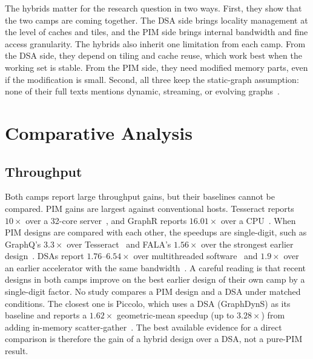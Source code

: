 \documentclass[journal,onecolumn]{IEEEtran}
\begin{document}
The hybrids matter for the research question in two ways. First, they show that the two camps are coming together. The DSA side brings locality management at the level of caches and tiles, and the PIM side brings internal bandwidth and fine access granularity. The hybrids also inherit one limitation from each camp. From the DSA side, they depend on tiling and cache reuse, which work best when the working set is stable. From the PIM side, they need modified memory parts, even if the modification is small. Second, all three keep the static-graph assumption: none of their full texts mentions dynamic, streaming, or evolving graphs~\cite{shin2025piccolo,shin2025fala,yenimol2026cograf}.

\section{Comparative Analysis}\label{sec:analysis}
\subsection{Throughput}
Both camps report large throughput gains, but their baselines cannot be compared. PIM gains are largest against conventional hosts. Tesseract reports $10\times$ over a 32-core server~\cite{ahn2015tesseract}, and GraphR reports $16.01\times$ over a CPU~\cite{song2018graphr}. When PIM designs are compared with each other, the speedups are single-digit, such as GraphQ's $3.3\times$ over Tesseract~\cite{zhuo2019graphq} and FALA's $1.56\times$ over the strongest earlier design~\cite{shin2025fala}. DSAs report $1.76$--$6.54\times$ over multithreaded software~\cite{ham2016graphicionado} and $1.9\times$ over an earlier accelerator with the same bandwidth~\cite{yan2019graphdyns}. A careful reading is that recent designs in both camps improve on the best earlier design of their own camp by a single-digit factor. No study compares a PIM design and a DSA under matched conditions. The closest one is Piccolo, which uses a DSA (GraphDynS) as its baseline and reports a $1.62\times$ geometric-mean speedup (up to $3.28\times$) from adding in-memory scatter-gather~\cite{shin2025piccolo}. The best available evidence for a direct comparison is therefore the gain of a hybrid design over a DSA, not a pure-PIM result.
\end{document}

